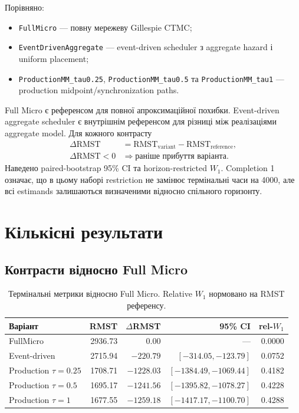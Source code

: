 \documentclass[11pt,a4paper]{article}
\begin{document}
Порівняно:
\begin{itemize}
  \item \texttt{FullMicro} --- повну мережеву Gillespie CTMC;
  \item \texttt{EventDrivenAggregate} --- event-driven scheduler з
  aggregate hazard і uniform placement;
  \item \texttt{ProductionMM\_tau0.25}, \texttt{ProductionMM\_tau0.5} та
  \texttt{ProductionMM\_tau1} --- production midpoint/synchronization paths.
\end{itemize}

Full Micro є референсом для повної апроксимаційної похибки. Event-driven
aggregate scheduler є внутрішнім референсом для різниці між реалізаціями
aggregate model. Для кожного контрасту
\[
 \begin{aligned}
 \Delta\mathrm{RMST}
   &=\mathrm{RMST}_{\mathrm{variant}}-\mathrm{RMST}_{\mathrm{reference}},\\
 \Delta\mathrm{RMST}<0
   &\Longrightarrow \text{раніше прибуття варіанта}.
 \end{aligned}
\]
Наведено paired-bootstrap 95\% CI та horizon-restricted $W_1$. Completion 1
означає, що в цьому наборі restriction не замінює термінальні часи на 4000,
але всі estimands залишаються визначеними відносно спільного горизонту.

\section{Кількісні результати}\label{sec:results}

\subsection{Контрасти відносно Full Micro}

\begin{table}[H]
\centering
\small
\caption{Термінальні метрики відносно Full Micro. Relative $W_1$ нормовано
на RMST референсу.}
\label{tab:full}
\begin{tabular}{lrrrr}
\toprule
Варіант & RMST & $\Delta$RMST & 95\% CI & rel-$W_1$ \\
\midrule
FullMicro & 2936.73 & 0.00 & --- & 0.0000 \\
Event-driven & 2715.94 & $-220.79$ & $[-314.05,-123.79]$ & 0.0752 \\
Production $\tau=0.25$ & 1708.71 & $-1228.03$ & $[-1384.49,-1069.44]$ & 0.4182 \\
Production $\tau=0.5$ & 1695.17 & $-1241.56$ & $[-1395.82,-1078.27]$ & 0.4228 \\
Production $\tau=1$ & 1677.55 & $-1259.18$ & $[-1417.17,-1100.70]$ & 0.4288 \\
\bottomrule
\end{tabular}
\end{table}
\end{document}
